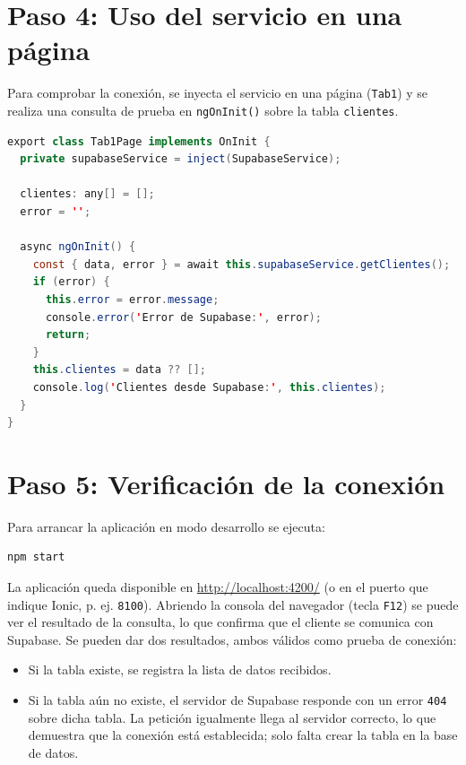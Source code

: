 \documentclass[11pt,a4paper]{article}
\begin{document}
\section{Paso 4: Uso del servicio en una página}

Para comprobar la conexión, se inyecta el servicio en una página
(\texttt{Tab1}) y se realiza una consulta de prueba en \texttt{ngOnInit()}
sobre la tabla \texttt{clientes}.

\begin{lstlisting}[language=Java,caption={src/app/tab1/tab1.page.ts (fragmento)}]
export class Tab1Page implements OnInit {
  private supabaseService = inject(SupabaseService);

  clientes: any[] = [];
  error = '';

  async ngOnInit() {
    const { data, error } = await this.supabaseService.getClientes();
    if (error) {
      this.error = error.message;
      console.error('Error de Supabase:', error);
      return;
    }
    this.clientes = data ?? [];
    console.log('Clientes desde Supabase:', this.clientes);
  }
}
\end{lstlisting}

\section{Paso 5: Verificación de la conexión}

Para arrancar la aplicación en modo desarrollo se ejecuta:

\begin{lstlisting}[language=bash,caption={Arranque del servidor de desarrollo}]
npm start
\end{lstlisting}

La aplicación queda disponible en \url{http://localhost:4200/} (o en el puerto
que indique Ionic, p. ej. \texttt{8100}). Abriendo la consola del navegador
(tecla \texttt{F12}) se puede ver el resultado de la consulta, lo que confirma
que el cliente se comunica con Supabase. Se pueden dar dos resultados, ambos
válidos como prueba de conexión:
\begin{itemize}
  \item Si la tabla existe, se registra la lista de datos recibidos.
  \item Si la tabla aún no existe, el servidor de Supabase responde con un
        error \texttt{404} sobre dicha tabla. La petición igualmente llega al
        servidor correcto, lo que demuestra que la conexión está establecida;
        solo falta crear la tabla en la base de datos.
\end{itemize}
\end{document}
